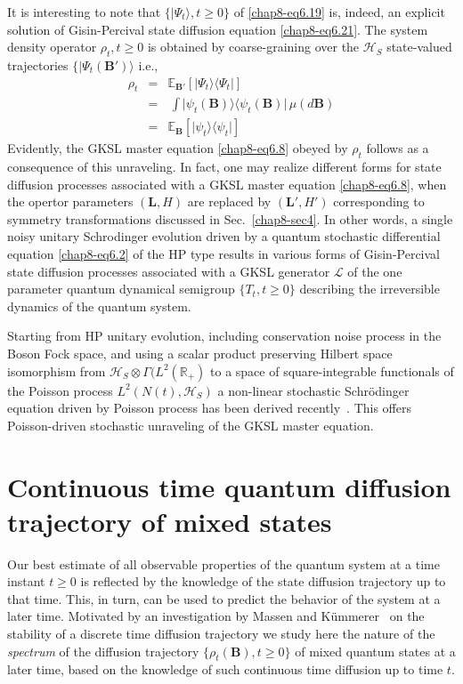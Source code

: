 It is interesting to note that $\{\vert\Psi_t\rangle, t\geq 0\}$ of \eqref{chap8-eq6.19} is, indeed, an explicit solution of Gisin-Percival state diffusion equation \eqref{chap8-eq6.21}. The system density operator $\rho_t, t\geq 0$ is obtained by coarse-graining over the $\mathcal{H}_S$ state-valued trajectories $\{\vert\Psi_t(\mathbf{B}')\rangle$ i.e.,   
\begin{eqnarray} 
		\rho_t&=&\mathbb{E}_{\mathbf{B}'}[\vert\Psi_t\rangle\langle\Psi_t\vert] \nonumber \\ 
		&=&\, \int \vert\psi_t(\mathbf{B})\rangle\langle\psi_t(\mathbf{B})\vert\,  
		\mu(d\mathbf{B}) \nonumber \\ 
		&=& \mathbb{E}_{\mathbf{B}}[\vert\psi_t\rangle\langle\psi_t\vert] \label{chap8-eq6.24}
\end{eqnarray}
Evidently, the GKSL master equation \eqref{chap8-eq6.8} obeyed by  $\rho_t$ follows as a consequence of this unraveling. In fact, one may realize different forms for state diffusion processes associated with a GKSL master equation \eqref{chap8-eq6.8}, when the opertor parameters $(\mathbf{L}, H)$ are replaced by $(\mathbf{L}', H')$ corresponding to symmetry transformations discussed in Sec.\ \ref{chap8-sec4}. In other words, a single noisy unitary Schrodinger evolution driven by a quantum stochastic differential equation \eqref{chap8-eq6.2} of the HP type results in various forms of Gisin-Percival state diffusion processes associated with a GKSL generator $\mathcal{L}$ of the one parameter quantum dynamical semigroup  $\{T_t, t\geq 0\}$ describing the irreversible dynamics of the  quantum system.  

Starting from  HP unitary evolution, including  conservation noise process in the Boson Fock space, and using a scalar product preserving Hilbert space isomorphism from  $\mathcal{H}_S\otimes\Gamma(L^2(\mathbb{R}_+)$ to a space  of square-integrable functionals of the Poisson process $L^2(N(t),\mathcal{H}_S)$ a non-linear stochastic Schr{\"o}dinger equation driven by Poisson process has been derived recently~\cite{chap8-key45}. This offers Poisson-driven stochastic unraveling of the GKSL master equation.         

\section{Continuous time quantum diffusion trajectory of  mixed states}\label{chap8-sec7}

Our best estimate of all observable properties of the quantum system at a time instant $t\geq 0$ is reflected by the knowledge of the state diffusion trajectory up to that time. This, in turn, can be used  to predict the behavior of the system at a later time. Motivated by an investigation by Massen and K{\"u}mmerer~\cite{chap8-key36} on the stability of a discrete time diffusion trajectory  we study here the nature of the {\em spectrum} of the diffusion trajectory $\{\rho_t(\mathbf{B}),t \geq 0\}$ of mixed quantum states at a later time, based on the knowledge of such continuous time diffusion up to time $t$.

